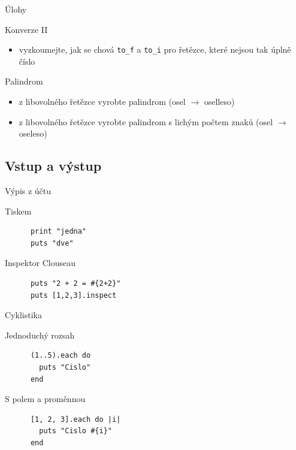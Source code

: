 \documentclass{beamer}
\begin{document}
\begin{frame}[fragile]{Úlohy}
  \begin{block}{Konverze II}
    \begin{itemize}
      \item vyzkoumejte, jak se chová \texttt{to\_f} a \texttt{to\_i} pro řetězce, které nejsou tak úplně číslo
    \end{itemize}
  \end{block}
  \pause
  \begin{block}{Palindrom}
    \begin{itemize}
      \item z libovolného řetězce vyrobte palindrom (osel $\to$ oselleso)
      \item z libovolného řetězce vyrobte palindrom s lichým počtem znaků (osel $\to$ oseleso)
    \end{itemize}
  \end{block}
\end{frame}

\subsection{Vstup a výstup}

\begin{frame}[fragile]{Výpis z účtu}
  \begin{block}{Tiskem}
    \begin{verbatim}
      print "jedna"
      puts "dve"
    \end{verbatim}
  \end{block}
  \pause
  \begin{block}{Inspektor Clouseau}
    \begin{verbatim}
      puts "2 + 2 = #{2+2}"
      puts [1,2,3].inspect
    \end{verbatim}
  \end{block}
\end{frame}

\begin{frame}[fragile]{Cyklistika}
  \begin{block}{Jednoduchý rozsah}
    \begin{verbatim}
      (1..5).each do
        puts "Cislo"
      end
    \end{verbatim}
  \end{block}
  \pause
  \begin{block}{S polem a proměnnou}
    \begin{verbatim}
      [1, 2, 3].each do |i|
        puts "Cislo #{i}"
      end
    \end{verbatim}
  \end{block}
\end{frame}
\end{document}
